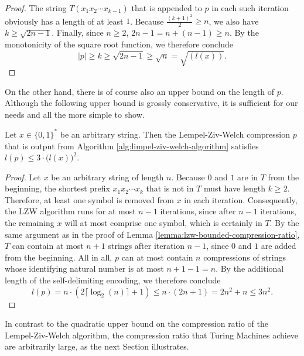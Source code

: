 \begin{proof}
	The string $T(x_1x_2\cdots x_{k-1})$ that is appended to $p$ in each such iteration obviously has a length of at least $1$.
	Because $\frac{(k+1)^2}{2}\geq n$, we also have $k\geq \sqrt{2n-1}$.
	Finally, since $n\geq 2$, $2n-1=n + (n-1)\geq n$. 
	By the monotonicity of the square root function, we therefore conclude
	\begin{equation}
		|p|\geq k \geq \sqrt{2n-1}\geq \sqrt{n} = \sqrt{(l(x))}.
	\end{equation}
\end{proof}

On the other hand, there is of course also an upper bound on the length of $p$.
Although the following upper bound is grossly conservative, it is sufficient for our needs and all the more simple to show.

\begin{lemma}
	\label{lemma:lzw-compression-length-upper-bound}
	Let $x\in\{0,1\}^{*}$ be an arbitrary string.
	Then the Lempel-Ziv-Welch compression $p$ that is output from Algorithm \ref{alg:limpel-ziv-welch-algorithm} satisfies $l(p)\leq 3\cdot \bigl(l(x)\bigr)^2$.
\end{lemma}
\begin{proof}
	Let $x$ be an arbitrary string of length $n$.
	Because $0$ and $1$ are in $T$ from the beginning, the shortest prefix $x_1x_2\cdots x_{k}$ that is not in $T$ must have length $k\geq 2$.
	Therefore, at least one symbol is removed from $x$ in each iteration. Consequently, the LZW algorithm runs for at most $n-1$ iterations, since after $n-1$ iterations, the remaining $x$ will at most comprise one symbol, which is certainly in $T$.
	By the same argument as in the proof of Lemma \ref{lemma:lzw-bounded-compression-ratio}, $T$ can contain at most $n+1$ strings after iteration $n-1$, since $0$ and $1$ are added from the beginning.
	All in all, $p$ can at most contain $n$ compressions of strings whose identifying natural number is at most $n+1 -1 =n$.
	By the additional length of the self-delimiting encoding, we therefore conclude
	\begin{equation}
		l(p)=n\cdot (2\lceil\log_2(n)\rceil+1)\leq n\cdot (2n+1)=2n^2+n\leq 3n^2. 
	\end{equation}
\end{proof}

In contrast to the quadratic upper bound on the compression ratio of the Lempel-Ziv-Welch algorithm, the compression ratio that Turing Machines achieve are arbitrarily large, as the next Section illustrates.

